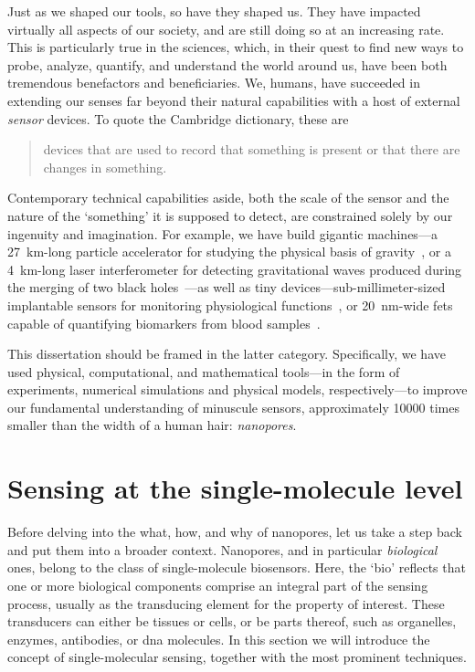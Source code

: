 Just as we shaped our tools, so have they shaped us. They have impacted virtually all aspects of our society,
and are still doing so at an increasing rate. This is particularly true in the sciences, which, in their quest
to find new ways to probe, analyze, quantify, and understand the world around us, have been both tremendous
benefactors and beneficiaries. We, humans, have succeeded in extending our senses far beyond their natural
capabilities with a host of external \emph{sensor} devices. To quote the Cambridge dictionary, these are
%
\begin{quote}
  devices that are used to record that something is present or that there are changes in something.
\end{quote}
%
Contemporary technical capabilities aside, both the scale of the sensor and the nature of the `something' it
is supposed to detect, are constrained solely by our ingenuity and imagination. For example, we have build
gigantic machines---a \SI{27}{\kilo\meter}-long particle accelerator for studying the physical basis of
gravity~\cite{ATLAS-2012}, or a \SI{4}{\kilo\meter}-long laser interferometer for detecting gravitational
waves produced during the merging of two black holes~\cite{Abbott-2016}---as well as tiny
devices---sub-millimeter-sized implantable sensors for monitoring physiological functions~\cite{Dong-2019}, or
\SI{20}{\nm}-wide \glspl{fet} capable of quantifying biomarkers from blood samples~\cite{Krivitsky-2016}.

This dissertation should be framed in the latter category. Specifically, we have used physical, computational,
and mathematical tools---in the form of experiments, numerical simulations and physical models,
respectively---to improve our fundamental understanding of minuscule sensors, approximately \num{10000} times
smaller than the width of a human hair: \emph{nanopores}.


%
%
\section{Sensing at the single-molecule level}
%

Before delving into the what, how, and why of nanopores, let us take a step back and put them into a broader
context. Nanopores, and in particular \emph{biological} ones, belong to the class of single-molecule
biosensors. Here, the `bio' reflects that one or more biological components comprise an integral part of the
sensing process, usually as the transducing element for the property of interest. These transducers can either
be tissues or cells, or be parts thereof, such as organelles, enzymes, antibodies, or \gls{dna} molecules. In
this section we will introduce the concept of single-molecular sensing, together with the most prominent
techniques.

